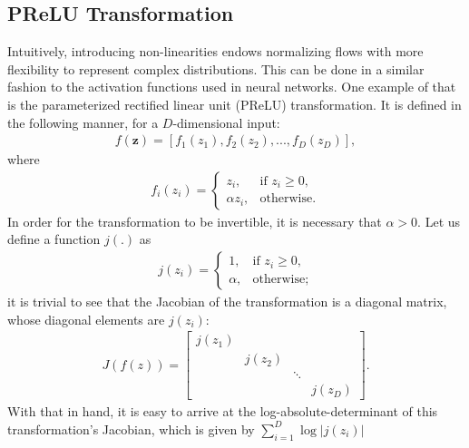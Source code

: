 \subsection{PReLU Transformation}
Intuitively, introducing non-linearities endows normalizing flows with more flexibility to
represent complex distributions. This can be done in a similar fashion to the
activation functions used in neural networks. One example of that is the parameterized
rectified linear unit (PReLU) transformation. It is defined in the following manner, for
a $D$-dimensional input:
\begin{align}
f(\bm{z}) = [f_1(z_1), f_2(z_2), ..., f_D(z_D)],
\end{align} where
\begin{align}
f_i(z_i) =
    \begin{cases}
        z_i,              & \text{if } z_i\geq 0, \\
        \alpha z_i,       & \text{otherwise}.
    \end{cases}
\end{align}
In order for the transformation to be invertible, it is necessary
that $\alpha > 0$.
Let us define a function $j(.)$ as
\begin{align}
j(z_i) =
    \begin{cases}
       1 ,              & \text{if } z_i \geq 0, \\
       \alpha ,       & \text{otherwise};
    \end{cases}
\end{align}
it is trivial to see that the Jacobian of the transformation is a diagonal
matrix, whose diagonal elements are $j(z_i)$:
\begin{align}
  J(f(z)) =
  \begin{bmatrix}
      j(z_1) & & & \\
      & j(z_2) & & \\
      & & \ddots & \\
      & & & j(z_D)
  \end{bmatrix}.
\end{align}
With that in hand, it is easy to arrive at the log-absolute-determinant of this transformation's
Jacobian, which is given by $\sum_{i=1}^D \log \big| j(z_i) \big|$

